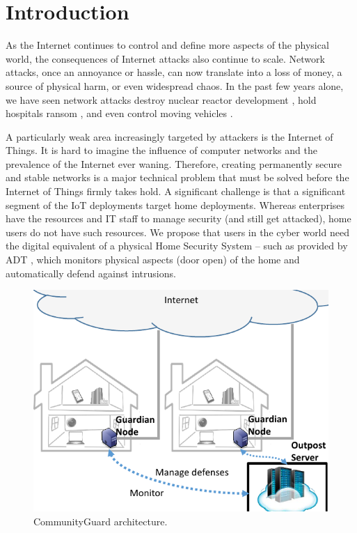 \section{Introduction}
\label{sec:intro}

As the Internet continues to control and define more aspects of the physical world, the consequences of Internet attacks also continue to scale. Network attacks, once an annoyance or hassle, can now translate into a loss of money, a source of physical harm, or even widespread chaos. In the past few years alone, we have seen network attacks destroy nuclear reactor development \cite{stux}, hold hospitals ransom \cite{ransom}, and even control moving vehicles \cite{carhack}. 

A particularly weak area increasingly targeted by attackers is the Internet of Things. It is hard to imagine the influence of computer networks and the prevalence of the Internet ever waning. Therefore, creating permanently secure and stable networks is a major technical problem that must be solved before the Internet of Things firmly takes hold. A significant challenge is that a significant segment of the IoT deployments target home deployments.  Whereas enterprises have the resources and IT staff to manage security (and still get attacked), home users do not have such resources.  We propose that users in the cyber world need the digital equivalent of a physical Home Security System -- such as provided by ADT \cite{adt}, which monitors physical aspects (\eg door open) of the home and automatically defend against intrusions. 



\begin{figure}
    \centering
    \includegraphics[width=0.95\columnwidth]{figs/highlevel.pdf}
    \caption{CommunityGuard architecture.}
    \label{fig:arch}
\end{figure}



